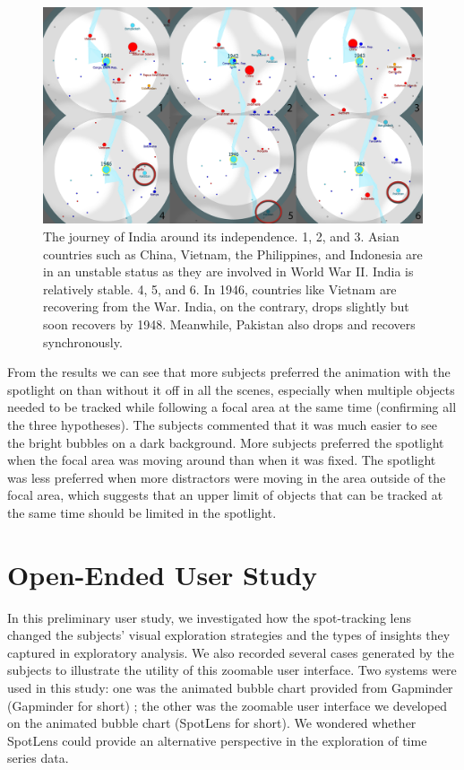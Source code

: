 \documentclass[review]{vgtc}                 %
\begin{document}
\begin{figure}[htb]
 \centering
 \includegraphics[width=1\linewidth]{India}
\vspace{-0.2in}
 \caption{The journey of India around its independence. 1, 2, and 3. Asian countries such as China, Vietnam, the Philippines, and Indonesia are in an unstable status as they are involved in World War II. India is relatively stable. 4, 5, and 6. In 1946, countries like Vietnam are recovering from the War. India, on the contrary, drops slightly but soon recovers by 1948. Meanwhile, Pakistan also drops and recovers synchronously.}
 \label{fig:india}
\vspace{-0.21in}
\end{figure}

From the results we can see that more subjects preferred the animation with the spotlight on than without it off in all the scenes, especially when multiple objects needed to be tracked while following a focal area at the same time (confirming all the three hypotheses). The subjects commented that it was much easier to see the bright bubbles on a dark background. More subjects preferred the spotlight when the focal area was moving around than when it was fixed. The spotlight was less preferred when more distractors were moving in the area outside of the focal area, which suggests that an upper limit of objects that can be tracked at the same time should be limited in the spotlight.

\section{Open-Ended User Study}
\label{sec:casestudy}

In this preliminary user study, we investigated how the spot-tracking lens changed the subjects' visual exploration strategies and the types of insights they captured in exploratory analysis. We also recorded several cases generated by the subjects to illustrate the utility of this zoomable user interface. Two systems were used in this study: one was the animated bubble chart provided from Gapminder (Gapminder for short) \cite{rosling_gapminder_2006}; the other was the zoomable user interface we developed on the animated bubble chart (SpotLens for short). We wondered whether SpotLens could provide an alternative perspective in the exploration of time series data.
\end{document}
